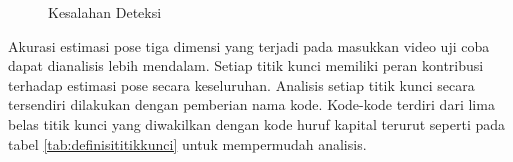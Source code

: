 \begin{figure}[htbp]
    \begin{center}
    \end{center}
    \vspace{-20pt}
    \captionsetup{labelfont=bf, textfont=bf}
    \caption{Kesalahan Deteksi}
    \vspace{-10pt}
    \captionsetup{labelfont=md, textfont=md}
    \label{fig:bro131}
\end{figure}

\pagebreak

Akurasi estimasi pose tiga dimensi yang terjadi pada masukkan video uji coba dapat dianalisis
lebih mendalam.
Setiap titik kunci memiliki peran kontribusi terhadap estimasi pose secara keseluruhan. Analisis
setiap titik kunci secara tersendiri dilakukan dengan
pemberian nama kode.
Kode-kode terdiri dari lima belas titik kunci yang diwakilkan dengan kode huruf kapital terurut seperti pada
tabel \ref{tab:definisititikkunci} untuk mempermudah analisis.

